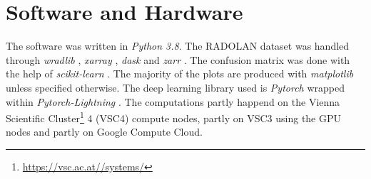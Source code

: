 \chapter{Software and Hardware}\label{appA}
\thispagestyle{plain}

The software was written in \textit{Python 3.8}. The RADOLAN dataset was handled through \textit{wradlib} \citep{Muhlbauer2022Wradlib/wradlib:V1.15.0}, \textit{xarray} \citep{Hoyer2022Xarray}, \textit{dask} \citep{DaskDevelopmentTeam2016Dask:Scheduling} and \textit{zarr} \citep{Miles2020Zarr-developers/zarr-python:V2.4.0}. The confusion matrix was done with the help of \textit{scikit-learn} \citep{Pedregosa2011Scikit-learn:Python}. The majority of the plots are produced with \textit{matplotlib} \citep{Caswell2019Matplotlib/matplotlib:V3.1.1} unless specified otherwise. The deep learning library used is \textit{Pytorch} \citep{Paszke2019PyTorch:Library} wrapped within \textit{Pytorch-Lightning} \citep{Falcon2020PyTorchLightning/pytorch-lightning:Release}. The computations partly happend on the Vienna Scientific Cluster\footnote{\hyperlink{https://vsc.ac.at//systems/}{https://vsc.ac.at//systems/}} 4 (VSC4) compute nodes, partly on VSC3 using the GPU nodes and partly on Google Compute Cloud.